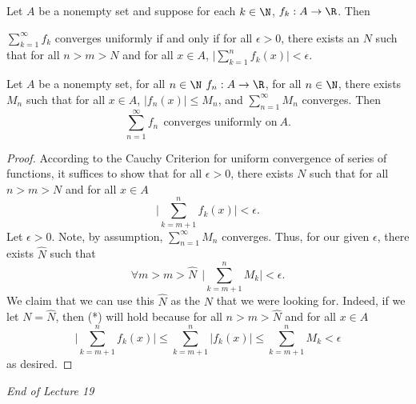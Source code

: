 \begin{theorem}\label{Cauchy Criterion for Uniform Convergence of Series of Functions}
    Let \( A  \) be a nonempty set and suppose for each \( k \in \N  \), \( {f}_{k } : A \to \R  \). Then
    \begin{center}
        \( \displaystyle \sum_{ k=1  }^{ \infty  } {f}_{k } \) converges uniformly if and only if for all \(  \epsilon > 0  \), there exists an \( N  \) such that for all \( n > m > N  \) and for all \( x \in A  \), \( \displaystyle \Big| \sum_{ k=1  }^{ n } {f}_{k } (x) \Big| < \epsilon \).
    \end{center}
\end{theorem}

\begin{theorem}\label{Weierstrass M-Test}
    Let \( A  \) be a nonempty set, for all \( n \in \N  \) \( {f}_{n} : A \to \R  \), for all \(  n \in \N  \), there exists \( {M}_{n} \) such that for all \( x \in A  \), \( | {f}_{n}(x) |  \leq {M}_{n} \), and \( \displaystyle \sum_{ n=1  }^{ \infty  } {M}_{n}  \) converges. Then 
    \[  \sum_{ n=1  }^{ \infty  } {f}_{n} \ \ \text{converges uniformly on} \ A.  \]
\end{theorem}
\begin{proof}
    According to the Cauchy Criterion for uniform convergence of series of functions, it suffices to show that for all \( \epsilon > 0  \), there exists \( N  \) such that for all \( n > m > N  \)  and for all \( x \in A  \)
    \[  \Big| \sum_{ k=m+1  }^{ n  } {f}_{k } (x) \Big|  < \epsilon. \tag{*} \]
    Let \( \epsilon > 0 \).
    Note, by assumption, \( \displaystyle \sum_{ n=1  }^{ \infty  } {M}_{n} \) converges. Thus, for our given \( \epsilon  \), there exists \( \hat{N} \) such that 
    \[  \forall m > m > \hat{N} \ \ \Big| \sum_{ k = m + 1  }^{ n } {M}_{k }  \Big|  < \epsilon. \]
    We claim that we can use this \( \hat{N} \) as the \( N  \) that we were looking for. Indeed, if we let \( N = \hat{N} \), then (*) will hold because for all \( n > m > \hat{N} \) and for all \( x \in A  \)
    \[ \Big| \sum_{ k= m+1 }^{  n  } {f}_{k }(x) \Big|  \leq \sum_{ k = m + 1  }^{ n } | {f}_{k }(x) | \leq \sum_{ k= m + 1  }^{ n } {M}_{k } < \epsilon  \]
    as desired.
\end{proof}

\begin{center}
    \textit{End of Lecture 19} 
\end{center}



